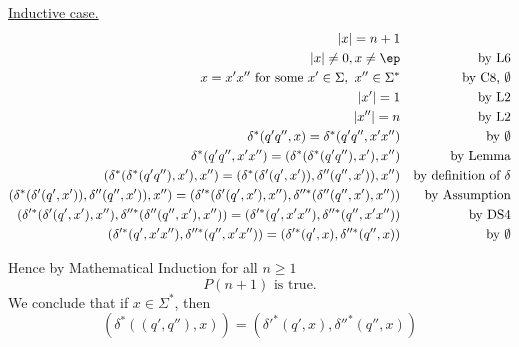 \underline{Inductive case.} 
\begin{align*}
|x| = n + 1                                                                                                     & & \\
|x|\ne 0,x\ne\ep                                                                                                & & \text{by L6} \\
x=x'x''\text{ for some }x'\in\Sigma,\text{ }x''\in\Sigma^*                                                      & & \text{by C8, $\emptyset$} \\
|x'|=1                                                                                                          & & \text{by L2} \\
|x''| = n                                                                                                       & & \text{by L2} \\
\delta^*(q'q'',x)=\delta^*(q'q'',x'x'')                                                                         & & \text{by $\emptyset$} \\
\delta^*(q'q'',x'x'')=(\delta^*(\delta^*(q'q''),x'),x'')                                                        & & \text{by Lemma} \\
(\delta^*(\delta^*(q'q''),x'),x'')=(\delta^*(\delta'(q',x')),\delta''(q'',x')),x'')                             & & \text{by definition of $\delta$} \\
(\delta^*(\delta'(q',x')),\delta''(q'',x')),x'')=(\delta'^*(\delta'(q',x'),x''),\delta''^*(\delta''(q'',x'),x'')) & & \text{by Assumption} \\
(\delta'^*(\delta'(q',x'),x''),\delta''^*(\delta''(q'',x'),x''))=(\delta'^*(q',x'x''),\delta''^*(q'',x'x''))    & & \text{by DS4} \\
(\delta'^*(q',x'x''),\delta''^*(q'',x'x''))=(\delta'^*(q',x),\delta''^*(q'',x))                                 & & \text{by $\emptyset$}
\end{align*}

Hence by Mathematical Induction for all $n \geq 1$
\[
P(n+1)\text{ is true.}
\]
We conclude that if $x \in \Sigma^*$, then
\[
(\delta^*((q',q''),x))=(\delta'^*(q',x),\delta''^*(q'',x))  
\]
